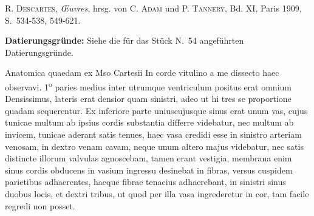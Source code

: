 %
\begin{ledgroupsized}[r]{114mm}
\footnotesize 
\pstart \parindent -6mm
%
\cite{00120}\textsc{R. Descartes}, \textit{{\OE}uvres}, hrsg. von \textsc{C. Adam} und \textsc{P. Tannery}, Bd. XI, Paris 1909, S.~534-538, 549-621.
\pend
\end{ledgroupsized}
%
\vspace*{5mm}
\begin{ledgroup}
\footnotesize 
\pstart
\noindent\footnotesize{\textbf{Datierungsgr\"{u}nde:}
Siehe die für das Stück N.~54
angeführten Datierungsgründe.
}%
\pend%
\end{ledgroup}%
%
\vspace*{8mm}%
\count{}
\count{}
\count{}
\pstart
\noindent [3~r\textsuperscript{o}]
\pend
\pstart%
\normalsize%
\noindent%
\centering%
Anatomica quaedam ex Mso Cartesii\protect{}%
\pend%
\vspace*{1.0em}%
\pstart%
\noindent%
In corde vitulino a me dissecto haec observavi. 1\textsuperscript{o} paries medius inter utrumque ventriculum positus erat omnium Densissimus,  lateris erat densior quam sinistri, adeo ut hi tres se proportione quadam sequerentur. 
\pend 
\newpage
\pstart  Ex inferiore parte uniuscujusque sinus erat unum vas, cujus tunicae  multum ab ipsius cordis substantia differre videbatur, nec multum ab invicem, tunicae aderant satis tenues, haec vasa credidi esse in sinistro arteriam venosam, in dextro venam cavam, neque unum altero majus videbatur, nec satis distincte illorum valvulas agnoscebam, tamen erant
vestigia, membrana enim sinus cordis obducens in vasium ingressu desinebat in fibras, versus cuspidem parietibus adhaerentes, haeque fibrae tenacius adhaerebant, in sinistri sinus duobus locis, et dextri tribus, ut quod per illa vasa ingrederetur in cor, tam facile regredi non posset.

